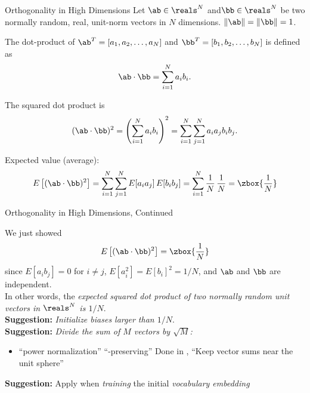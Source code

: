 
\begin{slide}[\slideopts,toc={Orthogonality}]{Orthogonality in High Dimensions}
\vspace{-1em}
% 
Let $\ab\in\reals^N$ and$\bb\in\reals^N$ be two normally random, real, unit-norm vectors in $N$ dimensions.
$\|\ab\|=\|\bb\|=1$.

The dot-product of
$\ab^T=[a_1,a_2,\ldots,a_N]$ and
$\bb^T=[b_1,b_2,\ldots,b_N]$ is defined as
\[
\ab \cdot \bb = \sum_{i=1}^{N} a_i b_i.
\]

The squared dot product is
\[
(\ab \cdot \bb)^2 = \left(\sum_{i=1}^{N} a_i b_i\right)^2 = \sum_{i=1}^{N} \sum_{j=1}^{N} a_i a_j b_i b_j.
\]

Expected value (average):
\[
E\left[(\ab \cdot \bb)^2\right]
= \sum_{i=1}^{N} \sum_{j=1}^{N} E[a_i a_j] \, E[b_i b_j]
= \sum_{i=1}^{N} \frac{1}{N}\,\frac{1}{N}
= \zbox{\frac{1}{N}}
\]
\end{slide}

\begin{slide}[\slideopts,toc={}]{Orthogonality in High Dimensions, Continued}

We just showed
\[
E\left[(\ab \cdot \bb)^2\right] = \zbox{\frac{1}{N}}
\]
since $E[a_i b_j]=0$ for $i \ne j$, $E[a_i^2] = E[b_i]^2 = 1/N$, and $\ab$ and $\bb$ are independent.\\
In other words, the \emph{expected squared dot product of two normally random unit vectors in $\reals^N$ is $1/N$}.\\
\textbf{Suggestion:} \emph{Initialize biases larger than $1/N$}.\\
\textbf{Suggestion:} \emph{Divide the sum of $M$ vectors by $\sqrt{M}$:}
\begin{itemize}
  \item ``power normalization''
  \mpitem ``-preserving''
  \mpitem Done in , \eg
  \mpitem ``Keep vector sums near the unit sphere''
\end{itemize}
\maybepause
\textbf{Suggestion:} Apply  when \emph{training} the initial \emph{vocabulary embedding}

\end{slide}

